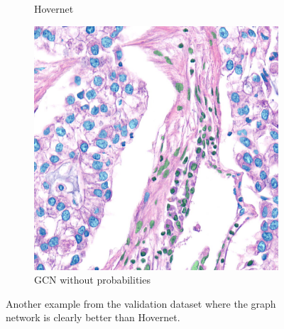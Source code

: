\begin{figure}[H]
\begin{subfigure}[b]{0.3\textwidth}
    \caption{Hovernet}
  \end{subfigure}
  \begin{subfigure}[b]{0.3\textwidth}
    \includegraphics[width=\textwidth]{imgs/qual/lung/val-no-prior1.png}
    \caption{GCN without probabilities}
  \end{subfigure}
    \caption{Another example from the validation dataset where the graph network is clearly better than Hovernet.}
    \label{fig:lung-val}
\end{figure}

